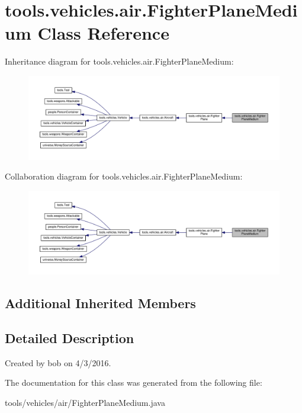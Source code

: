 \hypertarget{classtools_1_1vehicles_1_1air_1_1_fighter_plane_medium}{}\section{tools.\+vehicles.\+air.\+Fighter\+Plane\+Medium Class Reference}
\label{classtools_1_1vehicles_1_1air_1_1_fighter_plane_medium}


Inheritance diagram for tools.\+vehicles.\+air.\+Fighter\+Plane\+Medium\+:\nopagebreak
\begin{figure}[H]
\begin{center}
\leavevmode
\includegraphics[width=350pt]{classtools_1_1vehicles_1_1air_1_1_fighter_plane_medium__inherit__graph}
\end{center}
\end{figure}


Collaboration diagram for tools.\+vehicles.\+air.\+Fighter\+Plane\+Medium\+:\nopagebreak
\begin{figure}[H]
\begin{center}
\leavevmode
\includegraphics[width=350pt]{classtools_1_1vehicles_1_1air_1_1_fighter_plane_medium__coll__graph}
\end{center}
\end{figure}
\subsection*{Additional Inherited Members}


\subsection{Detailed Description}
Created by bob on 4/3/2016. 

The documentation for this class was generated from the following file\+:\begin{DoxyCompactItemize}
\item 
tools/vehicles/air/Fighter\+Plane\+Medium.\+java\end{DoxyCompactItemize}
